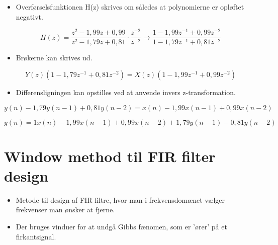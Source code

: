 \documentclass[danish]{article}
\begin{document}
\begin{itemize}
	\item Overførselsfunktionen H(z) skrives om således at polynomierne er opløftet negativt.
\end{itemize}

\begin{equation}
H(z) = \frac{z^2 - 1,99z + 0,99}{z^2 - 1,79z + 0,81} \cdot \frac{z^{-2}}{z^{-2}} \longrightarrow \frac{1 - 1,99z^{-1} + 0,99z^{-2}}{1 - 1,79z^{-1} + 0,81z^{-2}}
\end{equation}

\begin{itemize}
	\item Brøkerne kan skrives ud.
\end{itemize}

\begin{equation}
Y(z)(1-1,79z^{-1}+0,81z^{-2}) = X(z)(1-1,99z^{-1}+0,99 z^{-2})
\end{equation}

\begin{itemize}
	\item Differensligningen kan opstilles ved at anvende invers z-transformation.
\end{itemize}

\begin{equation}
y(n)-1,79y(n-1)+0,81y(n-2)=x(n)-1,99x(n-1)+0,99x(n-2)
\end{equation}

\begin{equation}
y(n)=1x(n)-1,99x(n-1)+0,99x(n-2)+1,79y(n-1)-0,81y(n-2)
\end{equation}



\newpage
\section{Window method til FIR filter design}

\begin{itemize}
	\item Metode til design af FIR filtre, hvor man i frekvensdomænet vælger frekvenser man ønsker at fjerne.
	\item Der bruges vinduer for at undgå Gibbs fænomen, som er 'ører' på et firkantsignal.
\end{itemize}
\end{document}
